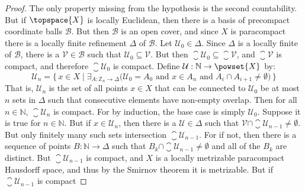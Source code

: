             \begin{proof}
                The only property missing from the hypothesis is the second
                countability. But if $\topspace{X}$ is locally Euclidean, then
                there is a basis of precompact coordinate balls $\mathcal{B}$.
                But then $\mathcal{B}$ is an open cover, and since $X$ is
                paracompact there is a locally finite refinement $\Delta$ of
                $\mathcal{B}$. Let $\mathcal{U}_{0}\in\Delta$. Since $\Delta$ is
                a locally finite of $\mathcal{B}$, there is a
                $\mathcal{V}\in\mathcal{B}$ such that
                $\mathcal{U}_{0}\subseteq\mathcal{V}$. But then
                $\closure{\mathcal{U}_{0}}\subseteq\closure{\mathcal{V}}$, and
                $\closure{\mathcal{V}}$ is compact, and therefore
                $\closure{\mathcal{U}_{0}}$ is compact. Define
                $\mathcal{U}:\mathbb{N}\rightarrow\powset{X}$ by:
                \begin{equation}
                    \mathcal{U}_{n}=\Big\{\,x\in{X}\;|\;
                        \exists_{A:\mathbb{Z}_{n}\rightarrow\Delta}
                        \big(\mathcal{U}_{0}=A_{0}\textrm{ and }
                         x\in{A}_{n}\textrm{ and }
                         A_{i}\cap{A}_{i+1}\ne\emptyset\big)\,\Big\}
                \end{equation}
                That is, $\mathcal{U}_{n}$ is the set of all points $x\in{X}$
                that can be connected to $\mathcal{U}_{0}$ be at most $n$
                sets in $\Delta$ such that consecutive elements have non-empty
                overlap. Then for all $n\in\mathbb{N}$,
                $\closure{\mathcal{U}_{n}}$ is compact. For by induction, the
                base case is simply $\mathcal{U}_{0}$. Suppose it is true for
                $n\in\mathbb{N}$. But if $x\in\mathcal{U}_{n}$, then there is a
                $\mathcal{U}\in\Delta$ such that
                $\mathcal{V}\cap\closure{\mathcal{U}_{n-1}}\ne\emptyset$. But
                only finitely many such sets intersection
                $\closure{\mathcal{U}_{n-1}}$. For if not, then there is a
                sequence of points $B:\mathbb{N}\rightarrow\Delta$ such that
                $B_{k}\cap\closure{\mathcal{U}_{n-1}}\ne\emptyset$ and all of
                the $B_{k}$ are distinct. But $\closure{\mathcal{U}_{n-1}}$
                is compact, and $X$ is a locally metrizable paracompact
                Hausdorff space, and thus by the Smirnov theorem it is
                metrizable. But if $\closure{\mathcal{U}_{n-1}}$ is compact

\end{proof}

